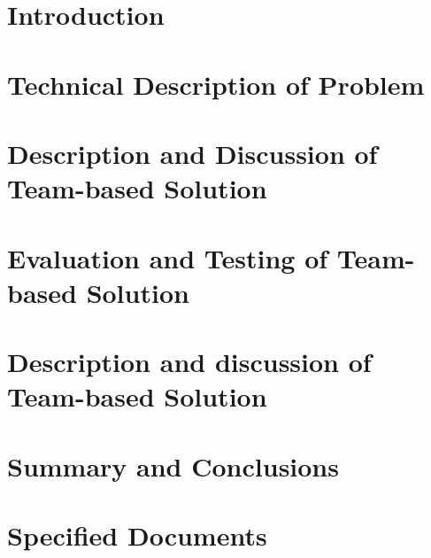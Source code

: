 \documentclass[a4paper]{report}
\begin{document}


\tableofcontents

\chapter{Introduction}

\chapter{Technical Description of Problem}

\chapter{Description and Discussion of Team-based Solution}

\chapter{Evaluation and Testing of Team-based Solution}

\chapter{Description and discussion of Team-based Solution}

\chapter{Summary and Conclusions}

\chapter{Specified Documents}
\end{document}
